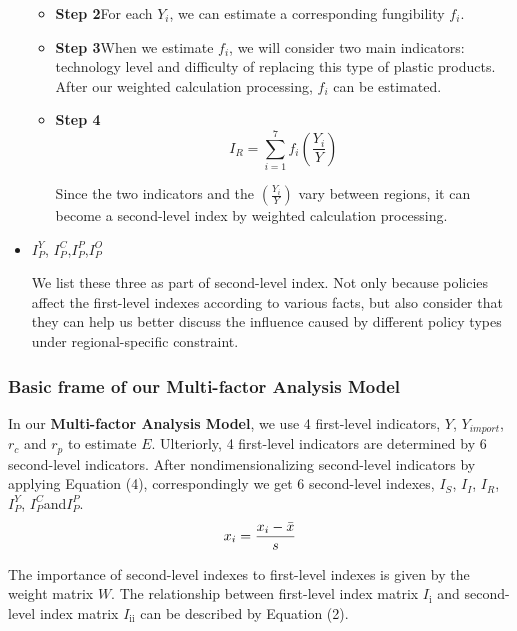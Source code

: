 \documentclass{mcmthesis}
\begin{document}
\begin{itemize}
\begin{itemize}
	   \item \textbf{Step 2}\quad For each $Y_i$, we can estimate a corresponding fungibility $f_i$.
	   
	   \item \textbf{Step 3}\quad When we estimate $f_i$, we will consider two main indicators: technology level and difficulty of replacing this type of plastic products. After our weighted calculation processing, $f_i$ can be estimated.
	   
	   \item \textbf{Step 4}
		   \begin{equation}
			I_{R}= \sum_{i=1}^{7}f_i\left(\frac{Y_i}{Y}\right)
			 \end{equation}
			
			 \qquad Since the two indicators and the $(\frac{Y_i}{Y})$ vary between regions, it can become a second-level index by weighted calculation processing.

	   \end{itemize}
		\item{$I_P^Y$, $I_P^C$,$I_P^P$,$I_P^O$} 
		
		We list these three as part of second-level index. Not only because policies affect the first-level indexes according to various facts, but also consider that they can help us better discuss the influence caused by different policy types under regional-specific constraint.
   \end{itemize}

	
   \subsubsection{Basic frame of our Multi-factor Analysis Model}
	 In our \textbf{Multi-factor Analysis Model}, we use 4 first-level indicators, $Y$, $Y_{import}$, $r_c$ and $r_p$ to estimate $E$. Ulteriorly, 4 first-level indicators are determined by 6 second-level indicators. After nondimensionalizing second-level indicators by applying Equation (4), correspondingly we get 6 second-level indexes, $I_S$, $I_I$, $I_R$, $I_P^Y$, $I_P^C$and$I_P^P$.
	 \begin{equation}
        x_i=\frac{x_i-\bar{x}}{s}\\
	  \end{equation}
	
	  The importance of second-level indexes to first-level indexes is given by the weight matrix \textbf{${W}$}. The relationship between first-level index matrix \textbf{$I_{\textrm{i}}$} and second-level index matrix \textbf{$I_{\textrm{ii}}$} can be described by Equation (2).
\end{document}
